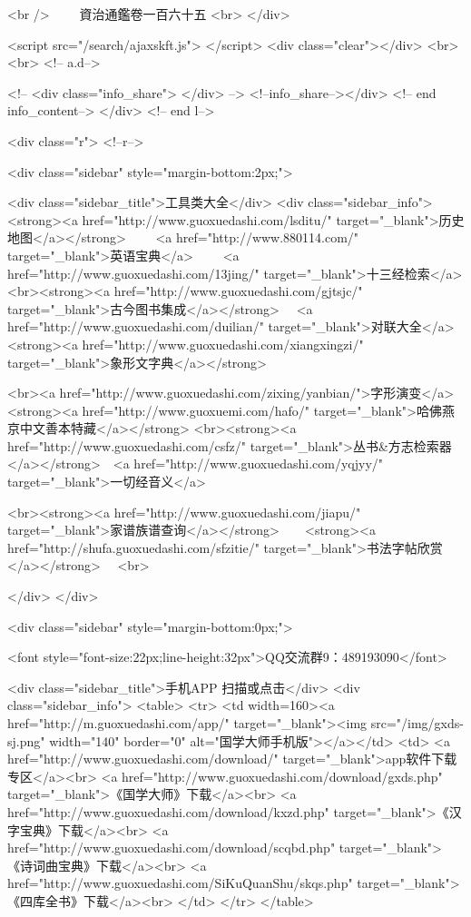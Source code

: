 <br />
　　資治通鑑卷一百六十五  <br>
   </div> 

<script src="/search/ajaxskft.js"> </script>
 <div class="clear"></div>
<br>
<br>
 <!-- a.d-->

 <!--
<div class="info_share">
</div> 
-->
 <!--info_share--></div>   <!-- end info_content-->
  </div> <!-- end l-->

<div class="r">   <!--r-->



<div class="sidebar"  style="margin-bottom:2px;">

 
<div class="sidebar_title">工具类大全</div>
<div class="sidebar_info">
<strong><a href="http://www.guoxuedashi.com/lsditu/" target="_blank">历史地图</a></strong>　　
<a href="http://www.880114.com/" target="_blank">英语宝典</a>　　
<a href="http://www.guoxuedashi.com/13jing/" target="_blank">十三经检索</a>　
<br><strong><a href="http://www.guoxuedashi.com/gjtsjc/" target="_blank">古今图书集成</a></strong>　
<a href="http://www.guoxuedashi.com/duilian/" target="_blank">对联大全</a>　<strong><a href="http://www.guoxuedashi.com/xiangxingzi/" target="_blank">象形文字典</a></strong>　

<br><a href="http://www.guoxuedashi.com/zixing/yanbian/">字形演变</a>　　<strong><a href="http://www.guoxuemi.com/hafo/" target="_blank">哈佛燕京中文善本特藏</a></strong>
<br><strong><a href="http://www.guoxuedashi.com/csfz/" target="_blank">丛书&方志检索器</a></strong>　<a href="http://www.guoxuedashi.com/yqjyy/" target="_blank">一切经音义</a>　　

<br><strong><a href="http://www.guoxuedashi.com/jiapu/" target="_blank">家谱族谱查询</a></strong>　　<strong><a href="http://shufa.guoxuedashi.com/sfzitie/" target="_blank">书法字帖欣赏</a></strong>　
<br>

</div>
</div>


<div class="sidebar" style="margin-bottom:0px;">

<font style="font-size:22px;line-height:32px">QQ交流群9：489193090</font>


<div class="sidebar_title">手机APP 扫描或点击</div>
<div class="sidebar_info">
<table>
<tr>
	<td width=160><a href="http://m.guoxuedashi.com/app/" target="_blank"><img src="/img/gxds-sj.png" width="140"  border="0" alt="国学大师手机版"></a></td>
	<td>
<a href="http://www.guoxuedashi.com/download/" target="_blank">app软件下载专区</a><br>
<a href="http://www.guoxuedashi.com/download/gxds.php" target="_blank">《国学大师》下载</a><br>
<a href="http://www.guoxuedashi.com/download/kxzd.php" target="_blank">《汉字宝典》下载</a><br>
<a href="http://www.guoxuedashi.com/download/scqbd.php" target="_blank">《诗词曲宝典》下载</a><br>
<a href="http://www.guoxuedashi.com/SiKuQuanShu/skqs.php" target="_blank">《四库全书》下载</a><br>
</td>
</tr>
</table>

